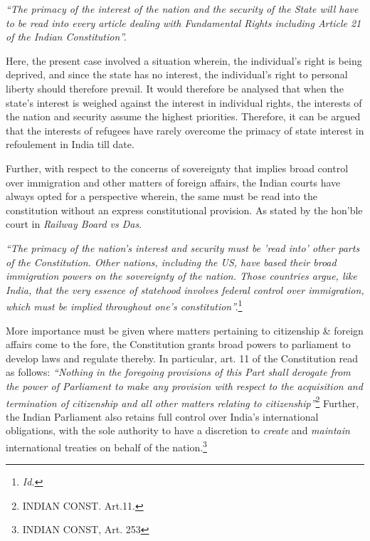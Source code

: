 \begin{multicols}{2}
\vspace{-.1cm}

\noi
\textit{“The primacy of the interest of the nation and the security of the State will have to be read
into every article dealing with Fundamental Rights including Article 21 of the Indian
Constitution”.}

\vspace{-.15cm}

\noi
Here, the present case involved a situation wherein, the individual's right is being deprived,
and since the state has no interest, the individual's right to personal liberty should therefore
prevail. It would therefore be analysed that when the state's interest is weighed against the
interest in individual rights, the interests of the nation and security assume the highest
priorities. Therefore, it can be argued that the interests of refugees have rarely overcome the
primacy of state interest in refoulement in India till date.

\vspace{-.15cm}

\noi
Further, with respect to the concerns of sovereignty that implies broad control over
immigration and other matters of foreign affairs, the Indian courts have always opted for a
perspective wherein, the same must be read into the constitution without an express
constitutional provision. As stated by the hon’ble court in \textit{Railway Board vs Das}.

\vspace{-.15cm}
\noi
\textit{“The primacy of the nation's interest and security must be 'read into' other parts of the
Constitution. Other nations, including the US, have based their broad immigration powers on
the sovereignty of the nation. Those countries argue, like India, that the very essence of statehood involves federal control over immigration, which must be implied throughout one's
constitution”.}\footnote{\textit{Id.}}

\vspace{-.15cm}

\noi
More importance must be given where matters pertaining to citizenship \& foreign affairs
come to the fore, the Constitution grants broad powers to parliament to develop laws and
regulate thereby. In particular, art. 11 of the Constitution read as follows: \textit{“Nothing in the
foregoing provisions of this Part shall derogate from the power of Parliament to make any
provision with respect to the acquisition and termination of citizenship and all other matters
relating to citizenship”}\footnote{INDIAN CONST. Art.11.} Further, the Indian Parliament also retains full control over India's
international obligations, with the sole authority to have a discretion to \textit{create} and \textit{maintain}
international treaties on behalf of the nation.\footnote{INDIAN CONST, Art. 253}


\end{multicols}
